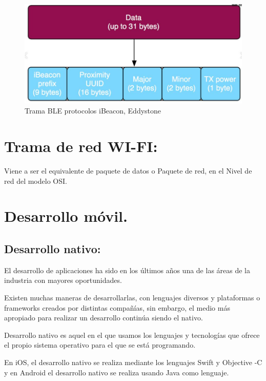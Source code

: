 \documentclass[conference,compsoc,onecolumn]{IEEEtran}
\begin{document}
 \begin{figure}[H]
\centering
\includegraphics[keepaspectratio, scale=1]{Imagenes/Imagen4.jpg}
\caption{Trama BLE protocolos iBeacon, Eddystone}
\end{figure}

\section{Trama de red WI-FI:}
Viene a ser el equivalente de paquete de datos o Paquete de red, en el Nivel de red del modelo OSI.

\section{Desarrollo móvil.}

\subsection{Desarrollo nativo:}


    El desarrollo de aplicaciones ha sido en los últimos años una de las áreas de la industria con mayores oportunidades.\newline


Existen muchas maneras de desarrollarlas, con lenguajes diversos y plataformas o frameworks creados por distintas compañías, sin embargo, el medio más apropiado para realizar un desarrollo continúa siendo el nativo.\newline


Desarrollo nativo es aquel en el que usamos los lenguajes y tecnologías que ofrece el propio sistema operativo para el que se está programando.\newline


En iOS, el desarrollo nativo se realiza mediante los lenguajes Swift y Objective -C y en Android el desarrollo nativo se realiza usando Java como lenguaje.\newline
\end{document}
